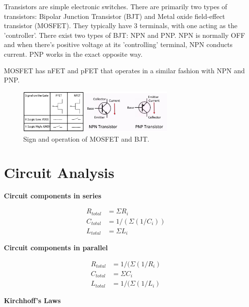 \documentclass{article}
\begin{document}
Transistors are simple electronic switches. There are primarily two types of transistors: Bipolar Junction Transistor (BJT) and Metal oxide field-effect transistor (MOSFET). They typically have 3 terminals, with one acting as the 'controller'. There exist two types of BJT: NPN and PNP. NPN is normally OFF and when there's positive voltage at its 'controlling' terminal, NPN conducts current. PNP works in the exact opposite way. \par
MOSFET has nFET and pFET that operates in a similar fashion with NPN and PNP.

\begin{figure}[!h]
	\center
	\includegraphics[width=0.7\textwidth, keepaspectratio]{transistor}
	\caption{Sign and operation of MOSFET and BJT.}
	\label{fig:transistor}
\end{figure}

\section{Circuit Analysis}

\textbf{\large{Circuit components in series}}\par

\begin{equation}
\begin{split}
	R_{total} & = \Sigma R_i\\
	C_{total} & = 1/(\Sigma(1/C_i))\\
	L_{total} & = \Sigma L_i
\end{split}
\end{equation}

\textbf{\large{Circuit components in parallel}}\par

\begin{equation}
\begin{split}
	R_{total} & = 1/(\Sigma (1/R_i)\\
	C_{total} & = \Sigma C_i\\
	L_{total} & = 1/(\Sigma (1/L_i)
\end{split}
\end{equation}

\textbf{\large{Kirchhoff's Laws}}\par
\end{document}
